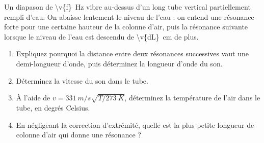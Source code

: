 Un diapason de \qty{\v{f}}{Hz} vibre au-dessus d'un long tube vertical partiellement rempli d'eau. On abaisse lentement le niveau de l'eau : on entend une résonance forte pour une certaine hauteur de la colonne d'air, puis la résonance suivante lorsque le niveau de l'eau est descendu de \qty{\v{dL}}{cm} de plus.

\begin{enumerate}[label=\alph*)]
    \item Expliquez pourquoi la distance entre deux résonances successives vaut une demi-longueur d'onde, puis déterminez la longueur d'onde du son.
    \item Déterminez la vitesse du son dans le tube.
    \item À l'aide de $v = \qty{331}{m/s}\sqrt{T/\qty{273}{K}}$, déterminez la température de l'air dans le tube, en degrés Celsius.
    \item En négligeant la correction d'extrémité, quelle est la plus petite longueur de colonne d'air qui donne une résonance ?
\end{enumerate}
